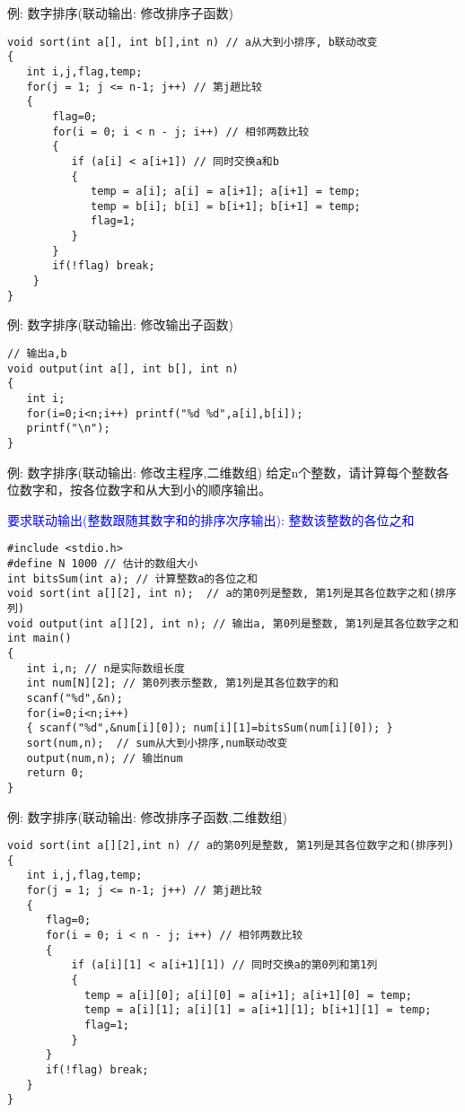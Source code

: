 \begin{frame}{例: 数字排序(联动输出: 修改排序子函数)}
\vspace{-0.3cm}
\begin{lstlisting}
void sort(int a[], int b[],int n) // a从大到小排序, b联动改变
{
   int i,j,flag,temp;
   for(j = 1; j <= n-1; j++) // 第j趟比较
   {
       flag=0;
       for(i = 0; i < n - j; i++) // 相邻两数比较
       {
          if (a[i] < a[i+1]) // 同时交换a和b
          { 
             temp = a[i]; a[i] = a[i+1]; a[i+1] = temp; 
             temp = b[i]; b[i] = b[i+1]; b[i+1] = temp; 
             flag=1;
          }
       }
       if(!flag) break;
    }
}
\end{lstlisting}
\end{frame}

\begin{frame}{例: 数字排序(联动输出: 修改输出子函数)}
\begin{lstlisting}
// 输出a,b
void output(int a[], int b[], int n)
{
   int i;
   for(i=0;i<n;i++) printf("%d %d",a[i],b[i]);
   printf("\n");
}
\end{lstlisting}
\end{frame}

\begin{frame}{例: 数字排序(联动输出: 修改主程序,二维数组)}
\vspace{-0.2cm}
给定n个整数，请计算每个整数各位数字和，按各位数字和从大到小的顺序输出。

\textcolor{blue}{要求联动输出(整数跟随其数字和的排序次序输出): 整数\quad 该整数的各位之和}
\begin{lstlisting}
#include <stdio.h>
#define N 1000 // 估计的数组大小
int bitsSum(int a); // 计算整数a的各位之和
void sort(int a[][2], int n);  // a的第0列是整数, 第1列是其各位数字之和(排序列)
void output(int a[][2], int n); // 输出a, 第0列是整数, 第1列是其各位数字之和
int main()
{
   int i,n; // n是实际数组长度 
   int num[N][2]; // 第0列表示整数, 第1列是其各位数字的和  
   scanf("%d",&n);
   for(i=0;i<n;i++) 
   { scanf("%d",&num[i][0]); num[i][1]=bitsSum(num[i][0]); }
   sort(num,n);  // sum从大到小排序,num联动改变
   output(num,n); // 输出num
   return 0;
}
\end{lstlisting}
\end{frame}

\begin{frame}{例: 数字排序(联动输出: 修改排序子函数,二维数组)}
\vspace{-0.3cm}
\begin{lstlisting}
void sort(int a[][2],int n) // a的第0列是整数, 第1列是其各位数字之和(排序列)
{
   int i,j,flag,temp;
   for(j = 1; j <= n-1; j++) // 第j趟比较
   {
      flag=0;
      for(i = 0; i < n - j; i++) // 相邻两数比较
      {
          if (a[i][1] < a[i+1][1]) // 同时交换a的第0列和第1列
          { 
            temp = a[i][0]; a[i][0] = a[i+1]; a[i+1][0] = temp; 
            temp = a[i][1]; a[i][1] = a[i+1][1]; b[i+1][1] = temp; 
            flag=1;
          }
      }
      if(!flag) break;
   }
}
\end{lstlisting}
\end{frame}

